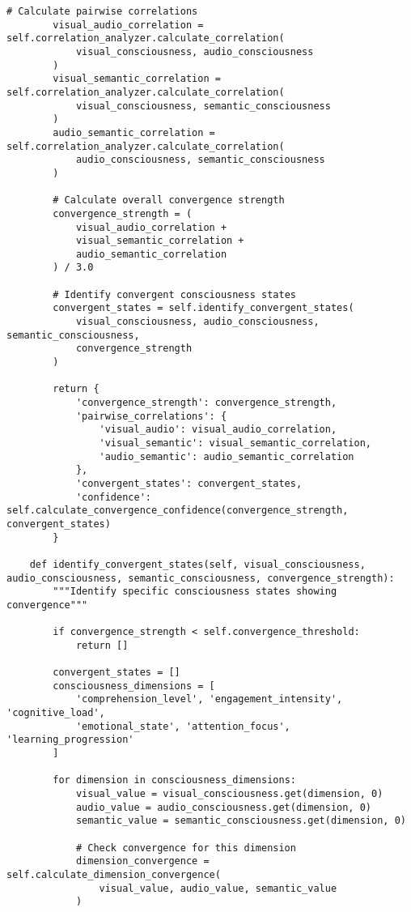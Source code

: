 \documentclass[12pt,a4paper]{article}
\begin{document}
\begin{lstlisting}[style=pythonstyle, caption=BMD Convergence Detection]
        # Calculate pairwise correlations
        visual_audio_correlation = self.correlation_analyzer.calculate_correlation(
            visual_consciousness, audio_consciousness
        )
        visual_semantic_correlation = self.correlation_analyzer.calculate_correlation(
            visual_consciousness, semantic_consciousness
        )
        audio_semantic_correlation = self.correlation_analyzer.calculate_correlation(
            audio_consciousness, semantic_consciousness
        )
        
        # Calculate overall convergence strength
        convergence_strength = (
            visual_audio_correlation + 
            visual_semantic_correlation + 
            audio_semantic_correlation
        ) / 3.0
        
        # Identify convergent consciousness states
        convergent_states = self.identify_convergent_states(
            visual_consciousness, audio_consciousness, semantic_consciousness,
            convergence_strength
        )
        
        return {
            'convergence_strength': convergence_strength,
            'pairwise_correlations': {
                'visual_audio': visual_audio_correlation,
                'visual_semantic': visual_semantic_correlation,
                'audio_semantic': audio_semantic_correlation
            },
            'convergent_states': convergent_states,
            'confidence': self.calculate_convergence_confidence(convergence_strength, convergent_states)
        }
    
    def identify_convergent_states(self, visual_consciousness, audio_consciousness, semantic_consciousness, convergence_strength):
        """Identify specific consciousness states showing convergence"""
        
        if convergence_strength < self.convergence_threshold:
            return []
        
        convergent_states = []
        consciousness_dimensions = [
            'comprehension_level', 'engagement_intensity', 'cognitive_load', 
            'emotional_state', 'attention_focus', 'learning_progression'
        ]
        
        for dimension in consciousness_dimensions:
            visual_value = visual_consciousness.get(dimension, 0)
            audio_value = audio_consciousness.get(dimension, 0)
            semantic_value = semantic_consciousness.get(dimension, 0)
            
            # Check convergence for this dimension
            dimension_convergence = self.calculate_dimension_convergence(
                visual_value, audio_value, semantic_value
            )
            

\end{lstlisting}
\end{document}
